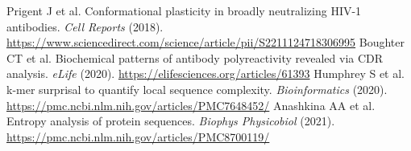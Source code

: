 \begin{small}
\begin{thebibliography}{99}
 Prigent J et al. Conformational plasticity in broadly neutralizing HIV-1 antibodies. \emph{Cell Reports} (2018). \url{https://www.sciencedirect.com/science/article/pii/S2211124718306995}
 Boughter CT et al. Biochemical patterns of antibody polyreactivity revealed via CDR analysis. \emph{eLife} (2020). \url{https://elifesciences.org/articles/61393}
 Humphrey S et al. k-mer surprisal to quantify local sequence complexity. \emph{Bioinformatics} (2020). \url{https://pmc.ncbi.nlm.nih.gov/articles/PMC7648452/}
 Anashkina AA et al. Entropy analysis of protein sequences. \emph{Biophys Physicobiol} (2021). \url{https://pmc.ncbi.nlm.nih.gov/articles/PMC8700119/}
\end{thebibliography}
\end{small}
